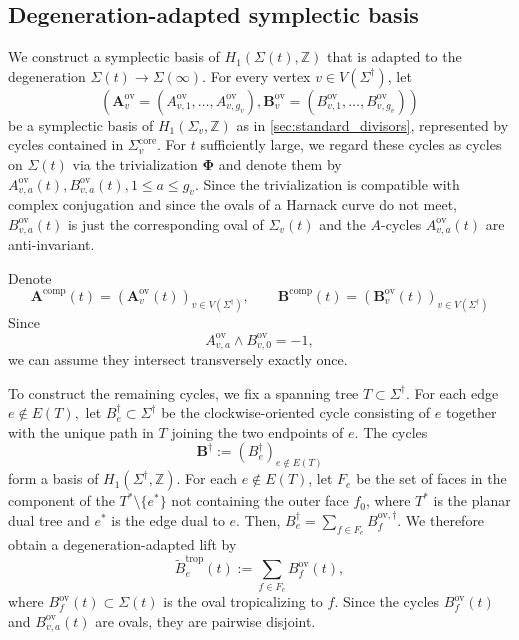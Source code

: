 \documentclass[12pt]{amsart}
\numberwithin{equation}{section}
\theoremstyle{definition}
\newcommand{\Z}{\mathbb{Z}}
\def\vertices{V}
\def\edges{E}
\def\trop{\dagger}
\def\mcurve{\Sigma}
\def\tropmcurve{\mcurve^\trop}
\begin{document}
\subsection{Degeneration-adapted symplectic basis}\label{sec:degen_adapted_basis}

We construct a symplectic basis of
$H_1(\mcurve(t),\Z)$ that is adapted to the degeneration
$
\mcurve(t)
\rightarrow
\mcurve(\infty).
$
For every vertex $v\in\vertices(\tropmcurve)$, let
\[
(\bm A_v^{\mathrm{ov}}
=
(
A_{v,1}^{\mathrm{ov}},
\dots,
A_{v,g_v}^{\mathrm{ov}}
),
\bm B_v^{\mathrm{ov}}
=
(
B_{v,1}^{\mathrm{ov}},
\dots,
B_{v,g_v}^{\mathrm{ov}}
))
\]
be a symplectic basis of
$H_1(\mcurve_v,\Z)$ as in \cref{sec:standard_divisors}, represented by cycles
contained in $\mcurve_v^{\mathrm{core}}$. For $t$ sufficiently large,
we regard these cycles as cycles on $\mcurve(t)$ via the trivialization $\bm \Phi$ and denote them by
$
A_{v,a}^{\mathrm{ov}}(t),
B_{v,a}^{\mathrm{ov}}(t),
1\leq a\leq g_v.
$
Since the trivialization is compatible with complex conjugation and since the ovals of a Harnack curve do not meet, $B_{v,a}^{\mathrm{ov}}(t)$ is just the corresponding oval of $\mcurve_v(t)$ and the $A$-cycles $A_{v,a}^{\mathrm{ov}}(t)$ are anti-invariant.


 Denote
\begin{equation}\label{eq:comp_cycles}
\bm A^{\mathrm{comp}}(t) = (
\bm A_{v}^{\mathrm{ov}}(t)
)_{
{
v\in\vertices(\tropmcurve)
}
}, \qquad \bm B^{\mathrm{comp}}(t) = (
\bm B_{v}^{\mathrm{ov}}(t)
)_{
{
v\in\vertices(\tropmcurve)
}
} 	
\end{equation}
Since 
\[
A_{v,a}^{\mathrm{ov}}\wedge B_{v,0}^{\mathrm{ov}}=-1,
\]
we can assume they intersect transversely exactly once.


To construct the remaining cycles, we fix a spanning tree $T\subset\tropmcurve$. For each edge
$
e\notin\edges(T),
$
let
$
B_e^\trop\subset\tropmcurve
$
be the clockwise-oriented cycle consisting of $e$ together with the unique path
in $T$ joining the two endpoints of $e$. The cycles
\[
\bm B^\trop := (B_e^\trop
)_{e\notin \edges(T)}
\]
form a basis of $H_1(\tropmcurve,\Z)$. For each $e\notin \edges(T)$, let $F_e$ be the set of faces in the
component of the $T^*\setminus\{e^*\}$ not containing the outer face $f_0$, where $T^*$ is the planar dual tree and $e^*$ is the edge dual to $e$. Then,
$
B_e^\trop
=
\sum_{f\in F_e} B_f^{\mathrm{ov},\trop}.
$
We therefore obtain a degeneration-adapted lift by
\begin{equation}\label{eq:ovals_to_deg}
\widetilde B_e^{\mathrm{trop}}(t)
:=
\sum_{f\in F_e} B_f^{\mathrm{ov}}(t),
\end{equation}
where $B_f^{\mathrm{ov}}(t) \subset \mcurve(t)$ is the oval tropicalizing to $f$. Since the cycles $B_f^{\mathrm{ov}}(t)$ and
$B_{v,a}^{\mathrm{ov}}(t)$ are ovals, they are pairwise disjoint. 
\end{document}
